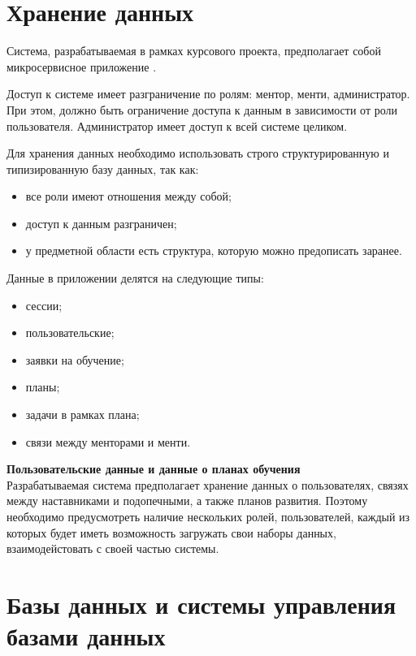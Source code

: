 
\section{Хранение данных}

Система, разрабатываемая в рамках курсового проекта, предполагает собой микросервисное приложение \cite{microservice}.

Доступ к системе имеет разграничение по ролям: ментор, менти, администратор. При этом, должно быть ограничение доступа к данным в зависимости от роли пользователя.  
Администратор имеет доступ к всей системе целиком.

Для хранения данных необходимо использовать строго структурированную и типизированную базу данных, так как:
\begin{itemize}
	\item все роли имеют отношения между собой;
	\item доступ к данным разграничен;
	\item у предметной области есть структура, которую можно предописать заранее.  
\end{itemize}

Данные в приложении делятся на следующие типы:
\begin{itemize}
    \item сессии;
    \item пользовательские;
    \item заявки на обучение;
    \item планы;
    \item задачи в рамках плана;
    \item связи между менторами и менти.
\end{itemize}

\noindent\textbf{Пользовательские данные и данные о планах обучения}\\

Разрабатываемая система предполагает хранение данных о пользователях, связях между наставниками и подопечными, а также планов развития.
Поэтому необходимо предусмотреть наличие нескольких ролей, пользователей, каждый из которых будет
иметь возможность загружать свои наборы данных, взаимодейстовать с своей частью системы.

\section{Базы данных и системы управления базами данных}

